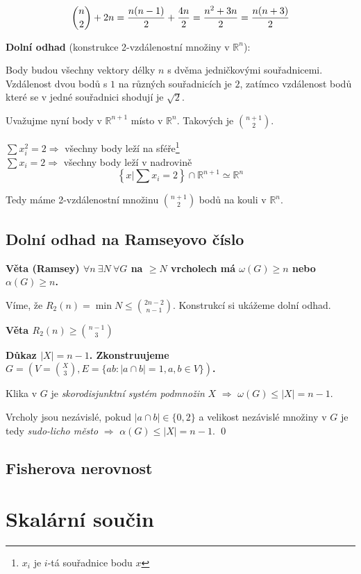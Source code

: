 \documentclass[a4paper,12pt,titlepage]{article}
\newcommand{\dk}{\smallskip\noindent\bf Důkaz\rm{} }
\newcommand{\vt}{\smallskip\noindent\bf Věta\rm{} }
\newcommand{\R}{\mathbb{R}}
\begin{document}
$${n\choose 2} + 2n = {n(n-1)\over 2} + {4n\over 2} = {n^2+3n\over 2} = {n(n+3) \over 2}$$

{\bf Dolní odhad} (konstrukce 2-vzdálenostní množiny v $\R^n$):

Body budou všechny vektory délky $n$ s dvěma jedničkovými souřadnicemi. Vzdálenost dvou bodů s $1$ na různých souřadnicích je $2$, zatímco vzdálenost bodů které se v jedné souřadnici shodují je $\sqrt 2$.

Uvažujme nyní body v $\R^{n+1}$ místo v $\R^n$. Takových je $n+1 \choose 2$. 

\bigskip
$\sum x_i^2 = 2 \Rightarrow$ všechny body leží na sféře\footnote{$x_i$ je $i$-tá souřadnice bodu $x$}\\
\indent$\sum x_i = 2 \Rightarrow$ všechny body leží v nadrovině \\

$$\left\{x | \sum x_i = 2 \right\} \cap \R^{n+1} \simeq \R^n$$

Tedy máme 2-vzdálenostní množinu $n+1 \choose 2$ bodů na kouli v $\R^n$.


\subsection{Dolní odhad na Ramseyovo číslo}
\vt (Ramsey) $\forall n\ \exists N\ \forall G$ na $\ge N$ vrcholech má $\omega(G) \ge n$ nebo $\alpha(G) \ge n$.

Víme, že $R_2(n) = \min N \le {2n-2\choose n-1}$. Konstrukcí si ukážeme dolní odhad.

\vt $R_2(n) \ge {n-1\choose 3}$

\dk $|X| = n-1$. Zkonstruujeme $G=\left(V={X\choose 3}, E=\{ab: |a\cap b|=1, a,b\in V\}\right)$.

Klika v $G$ je {\it skorodisjunktní systém podmnožin} $X$ $\Rightarrow$ $\omega(G) \le |X| = n-1$.

Vrcholy jsou nezávislé, pokud $|a\cap b| \in \{0,2\}$ a velikost nezávislé množiny 
v $G$ je tedy {\it sudo-licho město} $\Rightarrow$ $\alpha(G) \le |X| = n-1$.
\qed


\subsection{Fisherova nerovnost}

\section{Skalární součin}
\end{document}
